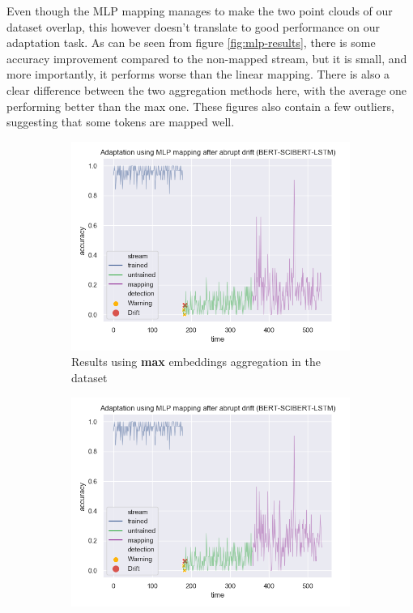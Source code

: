 \documentclass[12pt]{extreport}
\begin{document}
Even though the MLP mapping manages to make the two point clouds of our dataset overlap, this however doesn't translate to good performance on our adaptation task. As can be seen from figure \ref{fig:mlp-results}, there is some accuracy improvement compared to the non-mapped stream, but it is small, and more importantly, it performs worse than the linear mapping. There is also a clear difference between the two aggregation methods here, with the average one performing better than the max one. These figures also contain a few outliers, suggesting that some tokens are mapped well.

\begin{figure}[H]
\centering
\begin{subfigure}{.49\textwidth}
\centering
\includegraphics[width=\linewidth]{assets/addressing-change/mlp_mapping_lstm_wos_1_BERT_SCIBERT_10000_words_max.png}
\caption{Results using \textbf{max} embeddings aggregation in the dataset}
\label{fig:mlp-max}
\end{subfigure}
\begin{subfigure}{.49\textwidth}
\centering
\includegraphics[width=\linewidth]{assets/addressing-change/mlp_mapping_lstm_wos_1_BERT_SCIBERT_10000_words_average.png}

\end{subfigure}
\end{figure}
\end{document}
